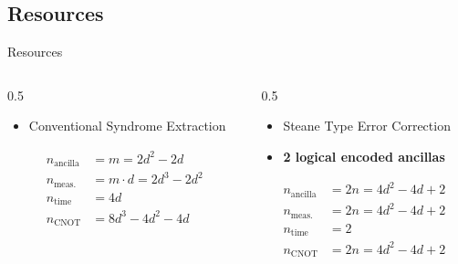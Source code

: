 \documentclass{beamer}
\begin{document}
\subsection*{Resources}
\begin{frame}{Resources}
    \small
\begin{columns}
\begin{column}{0.5\textwidth}
\begin{itemize}
    \item Conventional Syndrome Extraction
\end{itemize}
   \begin{align*}
    n_{\text{ancilla}} &= m = 2d^2 -2d \\
    n_{\text{meas.}} &=  m \cdot d = 2d^3 -2d^2 \\
    n_{\text{time}} &= 4 d \\
    n_{\text{CNOT}} &=  8d^3 - 4 d^2 -4d \\
    \end{align*} 
\end{column}    

\begin{column}{0.5\textwidth}
\begin{itemize}
    \item Steane Type Error Correction 
    \item \textbf{2 logical encoded ancillas}
\end{itemize}
\begin{align*}
    n_{\text{ancilla}} &= 2n =  4d^2 -4d +2 \\
    n_{\text{meas.}} &= 2n  = 4d^2 -4d +2  \\
    n_{\text{time}} &= 2  \\
    n_{\text{CNOT}} &= 2n  =   4d^2 -4d +2\\
\end{align*}
\end{column}    
\end{columns}
\end{frame}


\end{document}
